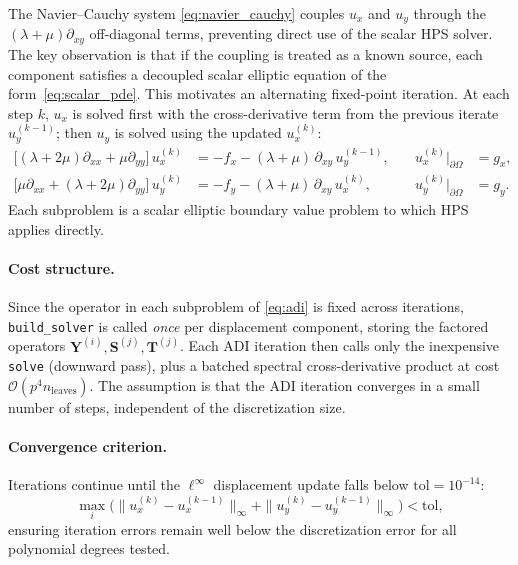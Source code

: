 \documentclass[hidelinks,onefignum,onetabnum]{siamart251216}
\newcommand{\dOmega}{\partial\Omega}
\begin{document}
The Navier--Cauchy system \cref{eq:navier_cauchy} couples $u_x$ and $u_y$ through the
$(\lambda+\mu)\partial_{xy}$ off-diagonal terms, preventing direct use of the scalar
HPS solver.
The key observation is that if the coupling is treated as a known source, each component
satisfies a decoupled scalar elliptic equation of the form~\cref{eq:scalar_pde}. This
motivates an alternating fixed-point iteration.
At each step $k$, $u_x$ is solved first with the cross-derivative term from the
previous iterate $u_y^{(k-1)}$; then $u_y$ is solved using the updated $u_x^{(k)}$:
\begin{subequations}\label{eq:adi}
\begin{alignat}{2}
  \bigl[(\lambda+2\mu)\partial_{xx} + \mu\partial_{yy}\bigr]\,u_x^{(k)}
    &= -f_x - (\lambda+\mu)\,\partial_{xy}\,u_y^{(k-1)},
    &\quad u_x^{(k)}\big|_{\dOmega} &= g_x,
    \label{eq:solve_x}\\
  \bigl[\mu\partial_{xx} + (\lambda+2\mu)\partial_{yy}\bigr]\,u_y^{(k)}
    &= -f_y - (\lambda+\mu)\,\partial_{xy}\,u_x^{(k)},
    &\quad u_y^{(k)}\big|_{\dOmega} &= g_y.
    \label{eq:solve_y}
\end{alignat}
\end{subequations}
Each subproblem is a scalar elliptic boundary value problem to which HPS applies
directly.

\paragraph{Cost structure.}
Since the operator in each subproblem of \cref{eq:adi} is fixed across iterations,
\texttt{build\_solver} is called \emph{once} per displacement component,
storing the factored operators $\mathbf{Y}^{(i)},\mathbf{S}^{(j)},\mathbf{T}^{(j)}$.
Each ADI iteration then calls only the inexpensive \texttt{solve} (downward pass), plus
a batched spectral cross-derivative product at cost $\mathcal{O}(p^4 n_\text{leaves})$.
The assumption is that the ADI iteration converges in a small number of steps, independent
of the discretization size.

\paragraph{Convergence criterion.}
Iterations continue until the $\ell^\infty$ displacement update falls below
$\text{tol} = 10^{-14}$:
\begin{equation}
  \max_i \bigl(\|u_x^{(k)}-u_x^{(k-1)}\|_\infty + \|u_y^{(k)}-u_y^{(k-1)}\|_\infty\bigr) < \text{tol},
\end{equation}
ensuring iteration errors remain well below the discretization error for all
polynomial degrees tested.
\end{document}
